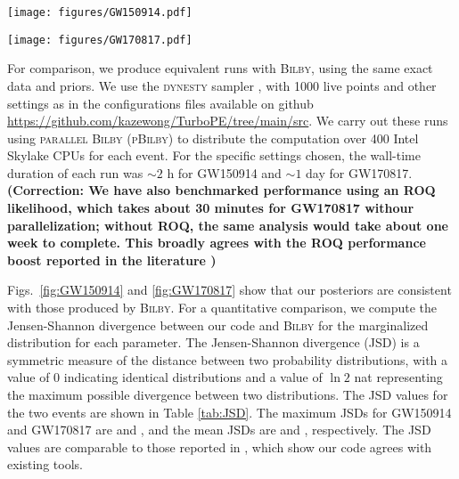 \documentclass[twocolumn]{aastex631}
\newcommand{\corr}[1]{\textbf{\color{pyRed}(Correction: #1)}}
\begin{document}
\begin{figure*}
    \texttt{[image: figures/GW150914.pdf]}
    \caption{
      GW150914 posterior computed by our code (blue) and \textsc{Bilby} (gray).
    }
    \label{fig:GW150914}
\end{figure*}

\begin{figure*}
\texttt{[image: figures/GW170817.pdf]}
\caption{
    GW170817 posterior computed by our code (blue) and \textsc{Bilby} (gray).
}
\label{fig:GW170817}
\end{figure*}

For comparison, we produce equivalent runs with \textsc{Bilby}, using the same
exact data and priors.  We use the \textsc{dynesty} sampler
\citep{2020MNRAS.493.3132S,dynesty}, with 1000 live points and other settings as
in the configurations files available on github
\url{https://github.com/kazewong/TurboPE/tree/main/src}.  We carry out these
runs using \textsc{parallel Bilby} (\textsc{pBilby}) \citep{Smith:2019ucc} to
distribute the computation over 400 Intel Skylake CPUs for each event. For the
specific settings chosen, the wall-time duration of each run was ${\sim}2$ h for
GW150914 and ${\sim}1$ day for GW170817. \corr{We have also benchmarked
performance using an ROQ likelihood, which takes about 30 minutes for GW170817 withour parallelization;
without ROQ, the same analysis would take about one week to complete. This broadly agrees with
the ROQ performance boost reported in the literature \citep{Smith:2016qas}}

Figs.~\ref{fig:GW150914} and \ref{fig:GW170817} show that our posteriors are
consistent with those produced by \textsc{Bilby}.  For a quantitative
comparison, we compute the Jensen-Shannon divergence between our code and
\textsc{Bilby} for the marginalized distribution for each parameter. The
Jensen-Shannon divergence (JSD) is a symmetric measure of the distance between
two probability distributions, with a value of 0 indicating identical
distributions and a value of $\ln{2}$ nat representing the maximum
possible divergence between two distributions. The JSD values for the two events
are shown in Table \ref{tab:JSD}. The maximum JSDs for GW150914 and GW170817 are
\jsdMaxBBH and \jsdMaxBNS, and the mean JSDs are \jsdAvgBBH and \jsdAvgBNS,
respectively. The JSD values are comparable to those reported in
\cite{Romero-Shaw:2020owr}, which show our code agrees with existing tools.
\end{document}
